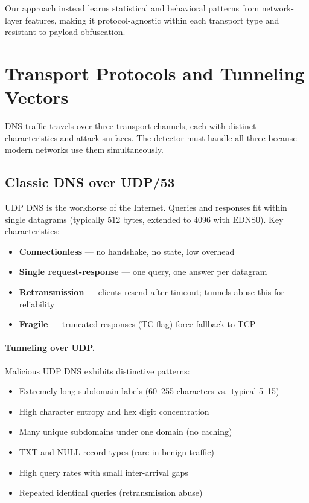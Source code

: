 \documentclass[12pt,a4paper]{article}
\begin{document}
Our approach instead learns statistical and behavioral patterns from network-layer features, making it protocol-agnostic within each transport type and resistant to payload obfuscation.

\section{Transport Protocols and Tunneling Vectors}

DNS traffic travels over three transport channels, each with distinct characteristics and attack surfaces. The detector must handle all three because modern networks use them simultaneously.

\subsection{Classic DNS over UDP/53}

UDP DNS is the workhorse of the Internet. Queries and responses fit within single datagrams (typically 512 bytes, extended to 4096 with EDNS0). Key characteristics:

\begin{itemize}
    \item \textbf{Connectionless} --- no handshake, no state, low overhead
    \item \textbf{Single request-response} --- one query, one answer per datagram
    \item \textbf{Retransmission} --- clients resend after timeout; tunnels abuse this for reliability
    \item \textbf{Fragile} --- truncated responses (TC flag) force fallback to TCP
\end{itemize}

\paragraph{Tunneling over UDP.}
Malicious UDP DNS exhibits distinctive patterns:
\begin{itemize}
    \item Extremely long subdomain labels (60--255 characters vs.\ typical 5--15)
    \item High character entropy and hex digit concentration
    \item Many unique subdomains under one domain (no caching)
    \item TXT and NULL record types (rare in benign traffic)
    \item High query rates with small inter-arrival gaps
    \item Repeated identical queries (retransmission abuse)
\end{itemize}
\end{document}
